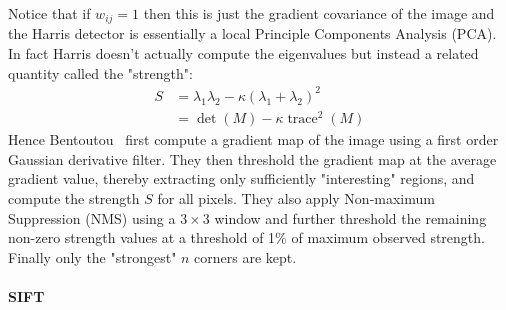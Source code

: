 Notice that if \(w_{ij} = 1\) then this is just the gradient covariance of the image and the Harris detector is essentially a local Principle Components Analysis (PCA).
%
In fact Harris doesn't actually compute the eigenvalues but instead a related quantity called the "strength":
\begin{align}
    S & = \lambda_1 \lambda_2 - \kappa (\lambda_1 + \lambda_2)^2 \\
      & = \det(M) - \kappa \operatorname{trace}^2(M)
    \label{eqn:strength}
\end{align}
%
Hence Bentoutou \etal~first compute a gradient map of the image using a first order Gaussian derivative filter.
%
They then threshold the gradient map at the average gradient value, thereby extracting only sufficiently "interesting" regions, and compute the strength \(S\) for all pixels.
%
They also apply Non-maximum Suppression (NMS) using a \(3 \times 3\) window and further threshold the remaining non-zero strength values at a threshold of 1\% of maximum observed strength.
%
Finally only the "strongest" \(n\) corners are kept.

\paragraph{SIFT}

